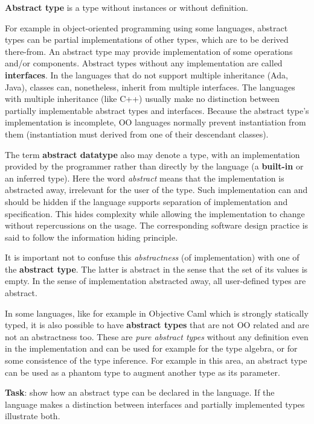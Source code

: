 \textbf{Abstract type} is a type without instances or without
definition.

For example in object-oriented programming using some languages,
abstract types can be partial implementations of other types, which
are to be derived there-from. An abstract type may provide
implementation of some operations and/or components. Abstract types
without any implementation are called \textbf{interfaces}. In the
languages that do not support multiple inheritance (Ada, Java),
classes can, nonetheless, inherit from multiple interfaces. The
languages with multiple inheritance (like C++) usually make no
distinction between partially implementable abstract types and
interfaces. Because the abstract type's implementation is incomplete,
OO languages normally prevent instantiation from them (instantiation
must derived from one of their descendant classes).

The term \textbf{abstract datatype} also may denote a type, with an
implementation provided by the programmer rather than directly by the
language (a \textbf{built-in} or an inferred type). Here the word
\emph{abstract} means that the implementation is abstracted away,
irrelevant for the user of the type. Such implementation can and
should be hidden if the language supports separation of implementation
and specification. This hides complexity while allowing the
implementation to change without repercussions on the usage. The
corresponding software design practice is said to follow the
information hiding principle.

It is important not to confuse this \emph{abstractness} (of
implementation) with one of the \textbf{abstract type}. The latter is
abstract in the sense that the set of its values is empty. In the sense
of implementation abstracted away, all user-defined types are abstract.

In some languages, like for example in Objective Caml which is strongly
statically typed, it is also possible to have \textbf{abstract types}
that are not OO related and are not an abstractness too. These are
\emph{pure abstract types} without any definition even in the
implementation and can be used for example for the type algebra, or for
some consistence of the type inference. For example in this area, an
abstract type can be used as a phantom type to augment another type as
its parameter.

\textbf{Task}: show how an abstract type can be declared in the
language. If the language makes a distinction between interfaces and
partially implemented types illustrate both.


